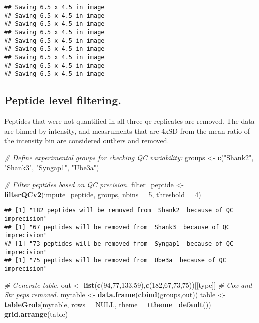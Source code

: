 \documentclass[]{article}
\newenvironment{Shaded}{\begin{snugshade}}{\end{snugshade}}
\newcommand{\KeywordTok}[1]{\textcolor[rgb]{0.13,0.29,0.53}{\textbf{#1}}}
\newcommand{\DataTypeTok}[1]{\textcolor[rgb]{0.13,0.29,0.53}{#1}}
\newcommand{\DecValTok}[1]{\textcolor[rgb]{0.00,0.00,0.81}{#1}}
\newcommand{\StringTok}[1]{\textcolor[rgb]{0.31,0.60,0.02}{#1}}
\newcommand{\CommentTok}[1]{\textcolor[rgb]{0.56,0.35,0.01}{\textit{#1}}}
\newcommand{\OtherTok}[1]{\textcolor[rgb]{0.56,0.35,0.01}{#1}}
\newcommand{\NormalTok}[1]{#1}
\begin{document}
\begin{verbatim}
## Saving 6.5 x 4.5 in image
## Saving 6.5 x 4.5 in image
## Saving 6.5 x 4.5 in image
## Saving 6.5 x 4.5 in image
## Saving 6.5 x 4.5 in image
## Saving 6.5 x 4.5 in image
## Saving 6.5 x 4.5 in image
## Saving 6.5 x 4.5 in image
## Saving 6.5 x 4.5 in image
\end{verbatim}

\subsection{Peptide level filtering.}\label{peptide-level-filtering.}

Peptides that were not quantified in all three qc replicates are
removed. The data are binned by intensity, and measruments that are 4xSD
from the mean ratio of the intensity bin are considered outliers and
removed.

\begin{Shaded}
\begin{Highlighting}[]
\CommentTok{# Define experimental groups for checking QC variability:}
\NormalTok{groups <-}\StringTok{ }\KeywordTok{c}\NormalTok{(}\StringTok{"Shank2"}\NormalTok{, }\StringTok{"Shank3"}\NormalTok{, }\StringTok{"Syngap1"}\NormalTok{, }\StringTok{"Ube3a"}\NormalTok{)}

\CommentTok{# Filter peptides based on QC precision.}
\NormalTok{filter_peptide <-}\StringTok{ }\KeywordTok{filterQCv2}\NormalTok{(impute_peptide, groups, }\DataTypeTok{nbins =} \DecValTok{5}\NormalTok{, }\DataTypeTok{threshold =} \DecValTok{4}\NormalTok{)}
\end{Highlighting}
\end{Shaded}

\begin{verbatim}
## [1] "182 peptides will be removed from  Shank2  because of QC imprecision"
## [1] "67 peptides will be removed from  Shank3  because of QC imprecision"
## [1] "73 peptides will be removed from  Syngap1  because of QC imprecision"
## [1] "75 peptides will be removed from  Ube3a  because of QC imprecision"
\end{verbatim}

\begin{Shaded}
\begin{Highlighting}[]
\CommentTok{# Generate table.}
\NormalTok{out <-}\StringTok{ }\KeywordTok{list}\NormalTok{(}\KeywordTok{c}\NormalTok{(}\DecValTok{94}\NormalTok{,}\DecValTok{77}\NormalTok{,}\DecValTok{133}\NormalTok{,}\DecValTok{59}\NormalTok{),}\KeywordTok{c}\NormalTok{(}\DecValTok{182}\NormalTok{,}\DecValTok{67}\NormalTok{,}\DecValTok{73}\NormalTok{,}\DecValTok{75}\NormalTok{))[[type]] }\CommentTok{# Cox and Str peps removed.}
\NormalTok{mytable <-}\StringTok{ }\KeywordTok{data.frame}\NormalTok{(}\KeywordTok{cbind}\NormalTok{(groups,out))}
\NormalTok{table <-}\StringTok{ }\KeywordTok{tableGrob}\NormalTok{(mytable, }\DataTypeTok{rows =} \OtherTok{NULL}\NormalTok{, }\DataTypeTok{theme =} \KeywordTok{ttheme_default}\NormalTok{())}
\KeywordTok{grid.arrange}\NormalTok{(table)}
\end{Highlighting}
\end{Shaded}
\end{document}
